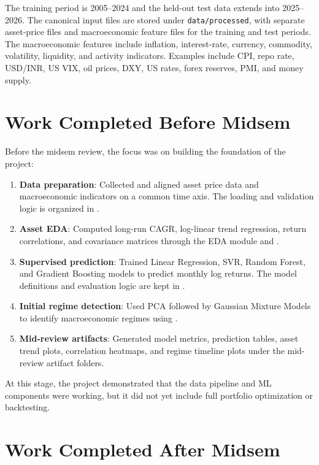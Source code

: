 \documentclass[11pt,a4paper]{article}
\begin{document}
The training period is 2005--2024 and the held-out test data extends into 2025--2026. The canonical input files are stored under \texttt{data/processed}, with separate asset-price files and macroeconomic feature files for the training and test periods. The macroeconomic features include inflation, interest-rate, currency, commodity, volatility, liquidity, and activity indicators. Examples include CPI, repo rate, USD/INR, US VIX, oil prices, DXY, US rates, forex reserves, PMI, and money supply.

\section{Work Completed Before Midsem}

Before the midsem review, the focus was on building the foundation of the project:

\begin{enumerate}[leftmargin=*]
    \item \textbf{Data preparation}: Collected and aligned asset price data and macroeconomic indicators on a common time axis. The loading and validation logic is organized in .
    \item \textbf{Asset EDA}: Computed long-run CAGR, log-linear trend regression, return correlations, and covariance matrices through the EDA module and .
    \item \textbf{Supervised prediction}: Trained Linear Regression, SVR, Random Forest, and Gradient Boosting models to predict monthly log returns. The model definitions and evaluation logic are kept in .
    \item \textbf{Initial regime detection}: Used PCA followed by Gaussian Mixture Models to identify macroeconomic regimes using .
    \item \textbf{Mid-review artifacts}: Generated model metrics, prediction tables, asset trend plots, correlation heatmaps, and regime timeline plots under the mid-review artifact folders.
\end{enumerate}

At this stage, the project demonstrated that the data pipeline and ML components were working, but it did not yet include full portfolio optimization or backtesting.

\section{Work Completed After Midsem}
\end{document}
